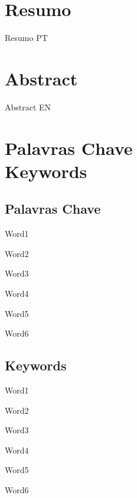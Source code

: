 \cleardoublepage


\chapter*{Resumo}
\thispagestyle{empty}

Resumo PT
\newpage


\chapter*{Abstract}
\thispagestyle{empty}

Abstract EN


\newpage

\chapter*{Palavras Chave \\ Keywords}
\thispagestyle{empty}

\section*{Palavras Chave}
{\large %

\noindent Word1

\noindent Word2

\noindent Word3

\noindent Word4

\noindent Word5

\noindent Word6
}

\section*{Keywords}

{\large %

\noindent Word1

\noindent Word2

\noindent Word3

\noindent Word4

\noindent Word5

\noindent Word6
}

\vfill


\cleardoublepage

\pagestyle{plain}

 
\def\contentsname{Contents}
\tableofcontents
\newpage

\listoffigures
\newpage

\listoftables

\cleardoublepage

